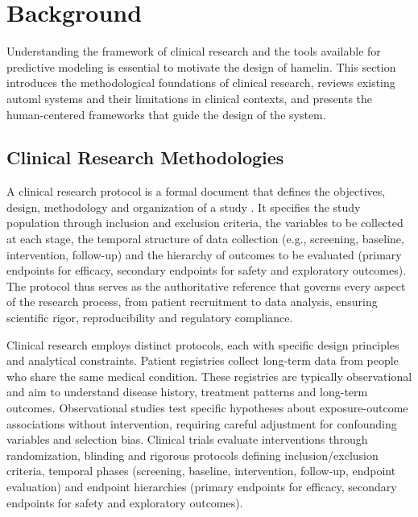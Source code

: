 \documentclass[conference,twocolumn]{IEEEtran}
\begin{document}
\section{Background}
\label{sec:background}

Understanding the framework of clinical research and the tools available for predictive modeling is essential to motivate the design of \gls{hamelin}. This section introduces the methodological foundations of clinical research, reviews existing \gls{automl} systems and their limitations in clinical contexts, and presents the human-centered frameworks that guide the design of the system.
  
\subsection{Clinical Research Methodologies}
\label{subsec:clinical_research}

A clinical research protocol is a formal document that defines the objectives,  
design, methodology and organization of a study \cite{kahlert2017control}. It  
specifies the study population through inclusion and exclusion criteria, the  
variables to be collected at each stage, the temporal structure of data collection  
(e.g., screening, baseline, intervention, follow-up) and the hierarchy of  
outcomes to be evaluated (primary endpoints for efficacy, secondary endpoints for  
safety and exploratory outcomes). The protocol thus serves as the authoritative  
reference that governs every aspect of the research process, from patient  
recruitment to data analysis, ensuring scientific rigor, reproducibility and  
regulatory compliance.
  
Clinical research employs distinct protocols, each with specific design principles and analytical constraints. Patient registries collect long-term data from people who share the same medical condition. These registries are typically observational and aim to understand disease history, treatment patterns and long-term outcomes. Observational studies test specific hypotheses about exposure-outcome associations without intervention, requiring careful adjustment for confounding variables and selection bias. Clinical trials evaluate interventions through randomization, blinding and rigorous protocols defining inclusion/exclusion criteria, temporal phases (screening, baseline, intervention, follow-up, endpoint evaluation) and endpoint hierarchies (primary endpoints for efficacy, secondary endpoints for safety and exploratory outcomes).
\end{document}
